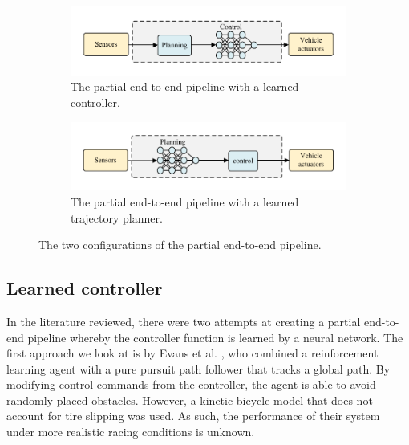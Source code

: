 \begin{figure}[htb!]
    \centering
    \begin{subfigure}[htb!]{\textwidth}
        \centering
        \includegraphics{contents/chapt2/figs/partial_end_to_end_pipeline_learned_control.pdf}
         \caption[The partial end-to-end pipeline with a learned controller]{The partial end-to-end pipeline with a learned controller.}
        \label{fig:pete_learned_control}
    \end{subfigure}
    \hfill
    \begin{subfigure}[htb!]{\textwidth}
        \centering
        \includegraphics{contents/chapt2/figs/partial_end_to_end_pipeline_learned_trajecory_planning.pdf}
        \caption[The partial end-to-end pipeline with a learned trajectory planner]{The partial end-to-end pipeline with a learned trajectory planner.}
        \label{fig:pete_learned_trajectory_planning}
    \end{subfigure}
\caption[Configurations of the partial end-to-end pipeline]{The two configurations of the partial end-to-end pipeline.}
\label{fig:pete}
\end{figure}


\subsection{Learned controller}
\label{sec:learned_controller}

In the literature reviewed, there were two attempts at creating a partial end-to-end pipeline whereby the controller function is learned by a neural network.
The first approach we look at is by Evans et al. \cite{Evans2021b}, who combined a reinforcement learning agent with a pure pursuit path follower that tracks a global path.
By modifying control commands from the controller, the agent is able to avoid randomly placed obstacles.
However, a kinetic bicycle model that does not account for tire slipping was used.
As such, the performance of their system under more realistic racing conditions is unknown.

